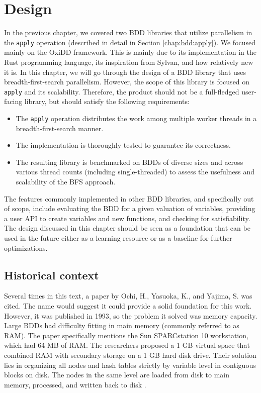 \chapter{Design}
\label{chap:design}

In the previous chapter, we covered two BDD libraries that utilize parallelism in the \texttt{apply} operation (described in detail in Section \ref{chap:bdd:apply}). We focused mainly on the OxiDD framework. This is mainly due
to its implementation in the Rust programming language, its inspiration from Sylvan, and how relatively new it is. In
this chapter, we will go through the design of a BDD library that uses breadth-first-search parallelism. However, the
scope of this library is focused on \texttt{apply} and its scalability. Therefore, the product should not be a
full-fledged user-facing library, but should satisfy the following requirements:

\begin{itemize}
    \item The \texttt{apply} operation distributes the work among multiple worker threads in a breadth-first-search
        manner.
    \item The implementation is thoroughly tested to guarantee its correctness.
    \item The resulting library is benchmarked on BDDs of diverse sizes and across various thread counts (including
        single-threaded) to assess the usefulness and scalability of the BFS approach.
\end{itemize}

The features commonly implemented in other BDD libraries, and specifically out of scope, include evaluating the BDD
for a given valuation of variables, providing a user API to create variables and new functions, and checking for
satisfiability. The design discussed in this chapter should be seen as a foundation that can be used in the future
either as a learning resource or as a baseline for further optimizations.


\section{Historical context}
\label{chap:design:history}
Several times in this text, a paper \cite{bfs-bdd} by Ochi, H., Yasuoka, K., and Yajima, S. was cited. The name would
suggest it could provide a solid foundation for this work. However, it was published in 1993, so the problem it
solved was memory capacity. Large BDDs had difficulty fitting in main memory (commonly referred to as RAM). The paper
specifically mentions the Sun SPARCstation 10 workstation, which had 64 MB of RAM. The researchers proposed a 1 GB
virtual space that combined RAM with secondary storage on a 1 GB hard disk drive. Their solution lies in organizing
all nodes and hash tables strictly by variable level in contiguous blocks on disk. The nodes in the same level are
loaded from disk to main memory, processed, and written back to disk \cite{bfs-bdd}.

